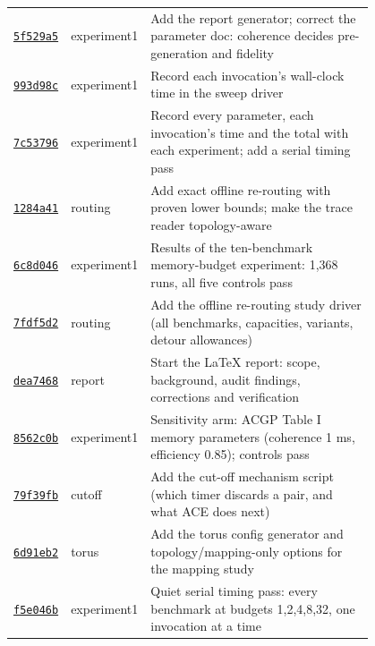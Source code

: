{\begin{longtable}{@{}lp{0.12\linewidth}p{0.68\linewidth}@{}}
\href{https://github.com/sanjeevkrishnaa/Compiler-Driven-ACE/commit/5f529a5}{\texttt{5f529a5}} & experiment1 & Add the report generator; correct the parameter doc: coherence decides pre-generation and fidelity \\
\href{https://github.com/sanjeevkrishnaa/Compiler-Driven-ACE/commit/993d98c}{\texttt{993d98c}} & experiment1 & Record each invocation's wall-clock time in the sweep driver \\
\href{https://github.com/sanjeevkrishnaa/Compiler-Driven-ACE/commit/7c53796}{\texttt{7c53796}} & experiment1 & Record every parameter, each invocation's time and the total with each experiment; add a serial timing pass \\
\href{https://github.com/sanjeevkrishnaa/Compiler-Driven-ACE/commit/1284a41}{\texttt{1284a41}} & routing & Add exact offline re-routing with proven lower bounds; make the trace reader topology-aware \\
\href{https://github.com/sanjeevkrishnaa/Compiler-Driven-ACE/commit/6c8d046}{\texttt{6c8d046}} & experiment1 & Results of the ten-benchmark memory-budget experiment: 1,368 runs, all five controls pass \\
\href{https://github.com/sanjeevkrishnaa/Compiler-Driven-ACE/commit/7fdf5d2}{\texttt{7fdf5d2}} & routing & Add the offline re-routing study driver (all benchmarks, capacities, variants, detour allowances) \\
\href{https://github.com/sanjeevkrishnaa/Compiler-Driven-ACE/commit/dea7468}{\texttt{dea7468}} & report & Start the LaTeX report: scope, background, audit findings, corrections and verification \\
\href{https://github.com/sanjeevkrishnaa/Compiler-Driven-ACE/commit/8562c0b}{\texttt{8562c0b}} & experiment1 & Sensitivity arm: ACGP Table I memory parameters (coherence 1 ms, efficiency 0.85); controls pass \\
\href{https://github.com/sanjeevkrishnaa/Compiler-Driven-ACE/commit/79f39fb}{\texttt{79f39fb}} & cutoff & Add the cut-off mechanism script (which timer discards a pair, and what ACE does next) \\
\href{https://github.com/sanjeevkrishnaa/Compiler-Driven-ACE/commit/6d91eb2}{\texttt{6d91eb2}} & torus & Add the torus config generator and topology/mapping-only options for the mapping study \\
\href{https://github.com/sanjeevkrishnaa/Compiler-Driven-ACE/commit/f5e046b}{\texttt{f5e046b}} & experiment1 & Quiet serial timing pass: every benchmark at budgets 1,2,4,8,32, one invocation at a time \\

\end{longtable}}
